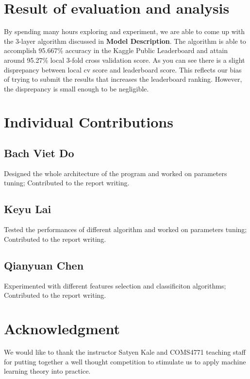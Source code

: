 \documentclass[conference]{IEEEtran}
\begin{document}
\section{Result of evaluation and analysis}
By spending many hours exploring and experiment, we are able to come up with the 3-layer algorithm discussed in \textbf{Model Description}. The algorithm is able to accomplish 95.667\% accuracy in the Kaggle Public Leaderboard and attain around 95.27\% local 3-fold cross validation score. As you can see there is a slight disprepancy between local cv score and leaderboard score. This reflects our bias of trying to submit the results that increases the leaderboard ranking. However, the disprepancy is small enough to be negligible.

\section{Individual Contributions}
\subsection{Bach Viet Do}
Designed the whole architecture of the program and worked on parameters tuning; Contributed to the report writing. 
\subsection{Keyu Lai}
Tested the performances of different algorithm and worked on parameters tuning; Contributed to the report writing. 
\subsection{Qianyuan Chen}
Experimented with different features selection and classificiton algorithms; Contributed to the report writing. 

\section*{Acknowledgment}
We would like to thank the instructor Satyen Kale and COMS4771 teaching staff for putting together a well thought competition to stimulate us to apply machine learning theory into practice.





\end{document}
